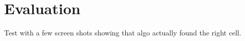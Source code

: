 \section{Evaluation}
Test with a few screen shots showing that algo actually found the right cell.

